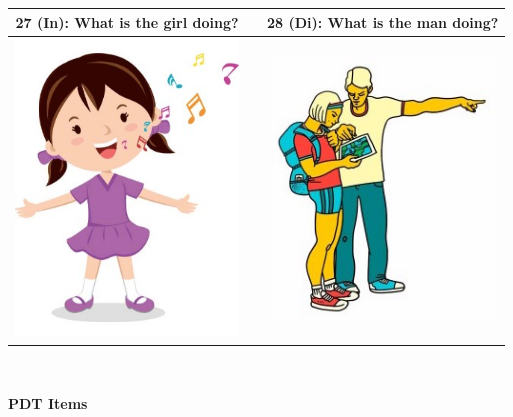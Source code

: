 \documentclass[12pt,notitlepage]{article}
\begin{document}
\begin{center}
\begin{tabular}{|c|c|c|}
\hline
27 (In): What is the girl doing? && 28 (Di): What is the man doing? \\
\hline
\includegraphics[width=16em,trim=0 0 0 -3]{figures/I27.jpg} & & \includegraphics[width=16em,trim=0 0 0 -3]{figures/I28.jpg} \\
\hline
\end{tabular}
\vspace{1em} \\


\clearpage

{\Large \textbf{PDT Items}}

\vspace{2em}


\end{center}
\end{document}
